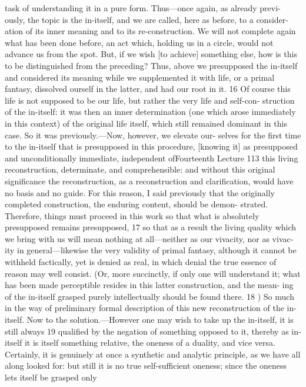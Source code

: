 task of understanding it in a pure form. Thus—once again, as already previ-
ously, the topic is the in-itself, and we are called, here as before, to a consider-
ation of its inner meaning and to its re-construction. We will not complete
again what has been done before, an act which, holding us in a circle, would
not advance us from the spot. But, if we wish [to achieve] something else, how
is this to be distinguished from the preceding? Thus, above we presupposed the
in-itself and considered its meaning while we supplemented it with life, or a
primal fantasy, dissolved ourself in the latter, and had our root in it. 16 Of course
this life is not supposed to be our life, but rather the very life and self-con-
struction of the in-itself: it was then an inner determination (one which arose
immediately in this context) of the original life itself, which still remained
dominant in this case. So it was previously.—Now, however, we elevate our-
selves for the first time to the in-itself that is presupposed in this procedure,
[knowing it] as presupposed and unconditionally immediate, independent ofFourteenth Lecture
113
this living reconstruction, determinate, and comprehensible: and without this
original significance the reconstruction, as a reconstruction and clarification,
would have no basis and no guide. For this reason, I said previously that the
originally completed construction, the enduring content, should be demon-
strated. Therefore, things must proceed in this work so that what is absolutely
presupposed remains presupposed, 17 so that as a result the living quality which
we bring with us will mean nothing at all—neither as our vivacity, nor as vivac-
ity in general—likewise the very validity of primal fantasy, although it cannot
be withheld factically, yet is denied as real, in which denial the true essence of
reason may well consist. (Or, more succinctly, if only one will understand it;
what has been made perceptible resides in this latter construction, and the mean-
ing of the in-itself grasped purely intellectually should be found there. 18 )
So much in the way of preliminary formal description of this new
reconstruction of the in-itself. Now to the solution.—However one may
wish to take up the in-itself, it is still always 19 qualified by the negation of
something opposed to it, thereby as in-itself it is itself something relative,
the oneness of a duality, and vice versa. Certainly, it is genuinely at once a
synthetic and analytic principle, as we have all along looked for: but still it
is no true self-sufficient oneness; since the oneness lets itself be grasped only
